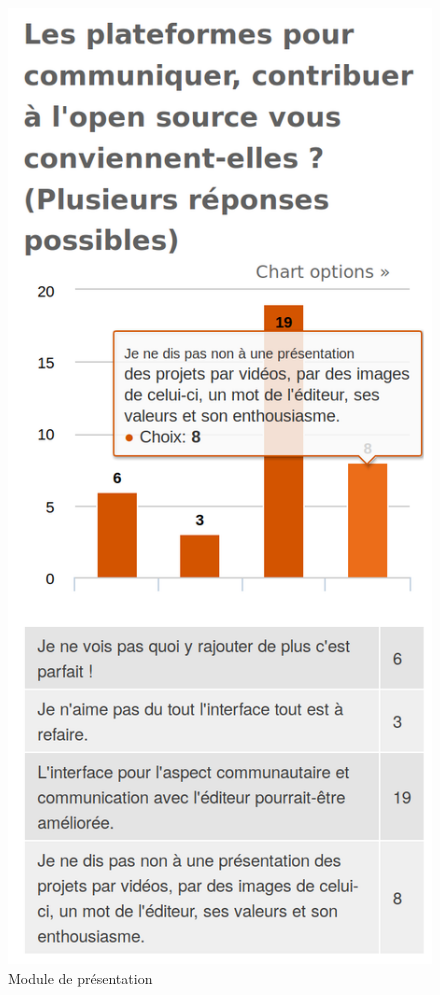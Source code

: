 			\begin{figure}[h]
				\center
				\includegraphics[scale=0.28]{./img/a92}
				\caption{Module de présentation}
			\end{figure}

